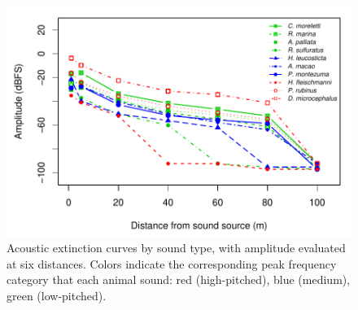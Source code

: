 \documentclass[fleqn,10pt,lineno]{wlpeerj} %
\begin{document}
\begin{figure}[H]

{\centering \includegraphics[width=1\linewidth]{ASR_MyPaper_2020_files/figure-latex/attenbyspp-1} 

}

\caption{Acoustic extinction curves by sound type, with amplitude evaluated at six distances. Colors indicate the corresponding peak frequency category that each animal sound: red (high-pitched), blue (medium), green (low-pitched).\label{fig:attenbyspp}}\label{fig:attenbyspp}
\end{figure}
\end{document}
